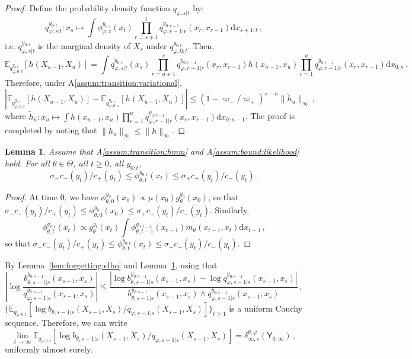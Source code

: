\documentclass{article}
\newtheorem{lemma}[theorem]{Lemma}
\newcommand{\1}{\mathbbm{1}}
\newcommand{\rmd}{\ensuremath{\mathrm{d}}}
\begin{document}
\begin{proof}
Define the probability density function $q_{\varphi,s|t}$ by:
$$
q^{y_{0:t}}_{\varphi,s|t}: x_s \mapsto \int   \phi^{y_{0:t}}_{\varphi,t}(x_t)\prod_{r=s+1}^tq^{y_{0:r-1}}_{\varphi,r-1|r}(x_r,x_{r-1}) \rmd x_{s+1:t}\,,
$$
i.e. $q^{y_{0:t}}_{\varphi,s|t}$ is the marginal density of $X_s$ under $q^{y_{0:t}}_{\varphi,0:t}$. Then,
$$
\mathbb{E}_{q^{y_{0:t}}_{\varphi,0:t}}\left[h(X_{u-1},X_u)\right]  = \int q^{y_{0:t}}_{\varphi,s|t}(x_s)\prod_{r = u+1}^{s}q^{y_{0:r-1}}_{\varphi,r-1|r}(x_r,x_{r-1})  h(x_{u-1},x_u)\prod_{r = 1}^{u}q^{y_{0:r-1}}_{\varphi,r-1|r}(x_r,x_{r-1}) \rmd x_{0:s}\,.
$$
Therefore, under A\ref{assum:transition:variational},
$$
\left| \mathbb{E}_{q^{y_{0:t}}_{\varphi,0:t}}\left[h(X_{u-1},X_u)\right] - \mathbb{E}_{q^{y_{0:s}}_{\varphi,0:s}}\left[h(X_{u-1},X_u)\right]\right|\leq \left(1-\varpi_-/\varpi_+\right)^{s-u}\|\tilde h_{u}\|_\infty\,,
$$
where $\tilde h_{u}: x_{u}\mapsto \int  h(x_{u-1},x_u)\prod_{r = 1}^{u}q^{y_{0:r-1}}_{\varphi,r-1|r}(x_r,x_{r-1}) \rmd x_{0:u-1}$. The proof is completed by noting that
$ \|\tilde h_{u}\|_\infty \leq \|h\|_\infty$.
\end{proof}

\begin{lemma}
\label{lem:bound:filter}
Assume that A\ref{assum:transition:hmm} and A\ref{assum:bound:likelihood} hold. For all $\theta\in\Theta$,  all $t\geq 0$, all $y_{0:t}$,
$$
\sigma_- c_-(y_t)/c_+(y_t)\leq \phi^{y_{0:t}}_{\theta,t}(x_{t})\leq \sigma_+ c_+(y_t)/c_-(y_t)\,.
$$
\end{lemma}
\begin{proof}
At time 0, we have $\phi^{y_{0}}_{\theta,0}(x_{0}) \propto \mu(x_0)g^{y_0}_\theta(x_0)$, so that $\sigma_- c_-(y_t)/c_+(y_t)\leq \phi^{y_{0}}_{\theta,0}(x_{0})\leq \sigma_+ c_+(y_t)/c_-(y_t)$. Similarly, 
$$
\phi^{y_{0:t}}_{\theta,t}(x_{t}) \propto g^{y_t}_\theta(x_t)\int \phi^{y_{0:t-1}}_{\theta,t-1}(x_{t-1})m_\theta(x_{t-1},x_t)\rmd x_{t-1}\,,
$$
so that $\sigma_- c_-(y_t)/c_+(y_t)\leq \phi^{y_{0:t}}_{\theta,t}(x_{t})\leq \sigma_+ c_+(y_t)/c_-(y_t)$.
\end{proof}

By Lemma~\ref{lem:forgetting:elbo} and Lemma~\ref{lem:bound:filter}, using that
$$
\left|\log \frac{b^{y_{0:s-1}}_{\theta,s-1|s}(x_{s-1},x_s)}{q^{y_{0:s-1}}_{\varphi,s-1|s}(x_{s-1},x_s)}\right|\leq \frac{\left|\log b^{y_{0:s-1}}_{\theta,s-1|s}(x_{s-1},x_s) - \log q^{y_{0:s-1}}_{\varphi,s-1|s}(x_{s-1},x_s)\right|}{b^{y_{0:s-1}}_{\theta,s-1|s}(x_{s-1},x_s)\wedge q^{y_{0:s-1}}_{\varphi,s-1|s}(x_{s-1},x_s)}\,,
$$
$\{\mathbb{E}_{q_{\varphi,0:t}}[\log b_{\theta,s-1|s}(X_{s-1},X_s)/q_{\varphi,s-1|s}(X_{s-1},X_s)]\}_{t\geq 1}$ is a uniform Cauchy sequence. Therefore, we can write
$$
\lim_{t\to\infty}\mathbb{E}_{q_{\varphi,0:t}}[\log b_{\theta,s-1|s}(X_{s-1},X_s)/q_{\varphi,s-1|s}(X_{s-1},X_s)] = \delta^{\theta,\varphi}_{\infty,s}(\mathsf{Y}_{0:\infty})\,,
$$  uniformly almost surely.
\end{document}
